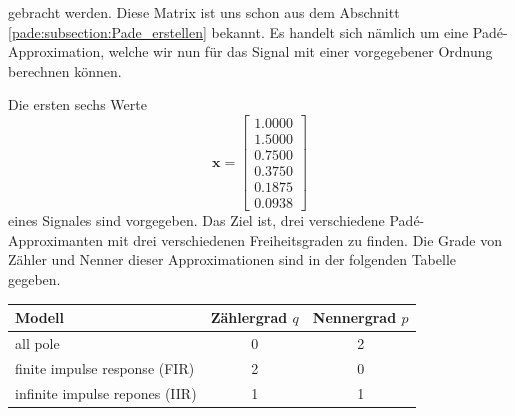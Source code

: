 gebracht werden.
Diese Matrix ist uns schon aus dem Abschnitt \ref{pade:subsection:Pade_erstellen} bekannt. Es handelt sich nämlich um eine Padé-Approximation,
welche wir nun für das Signal mit einer vorgegebener Ordnung berechnen können.

\begin{beispiel}

Die ersten sechs Werte 
\begin{equation*}
\bm x=\left[
\begin{array}{l}
1.0000\\
1.5000\\
0.7500\\
0.3750\\
0.1875 \\
0.0938
\end{array}\right]
\end{equation*}
eines Signales sind vorgegeben.
Das Ziel ist, drei verschiedene Padé-Approximanten mit drei verschiedenen
Freiheitsgraden zu finden.
Die Grade von Zähler und Nenner dieser Approximationen sind in der folgenden
Tabelle gegeben.
\begin{center}
\begin{tabular}{l|c|c}
Modell                         &Zählergrad $q$&Nennergrad $p$\\
\hline
all pole                       &            0 &            2 \\
finite impulse response (FIR)  &            2 &            0 \\
infinite impulse repones (IIR) &            1 &            1 \\
\hline
\end{tabular}
\end{center}


\end{beispiel}
